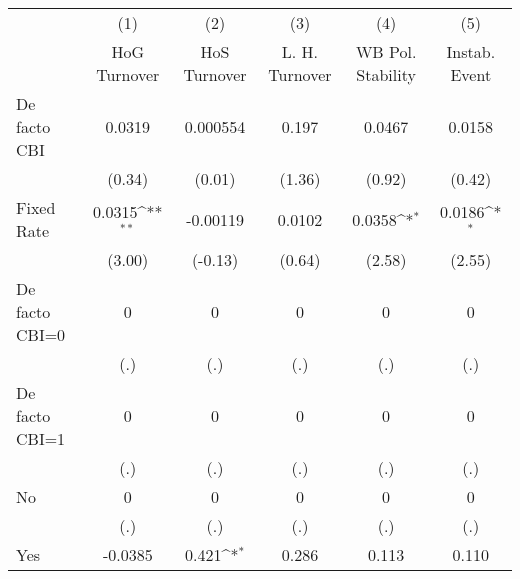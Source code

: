 \begin{table}[htbp]\centering
\def\sym#1{\ifmmode^{#1}\else\(^{#1}\)\fi}
\caption{\label{ifullicmultIndFEDF}}
\begin{tabular}{l*{5}{c}}
\toprule
                                        &\multicolumn{1}{c}{(1)}&\multicolumn{1}{c}{(2)}&\multicolumn{1}{c}{(3)}&\multicolumn{1}{c}{(4)}&\multicolumn{1}{c}{(5)}\\
                                        &\multicolumn{1}{c}{HoG Turnover}&\multicolumn{1}{c}{HoS Turnover}&\multicolumn{1}{c}{L. H. Turnover}&\multicolumn{1}{c}{WB Pol. Stability}&\multicolumn{1}{c}{Instab. Event}\\
\midrule
De facto CBI                            &   0.0319         & 0.000554         &    0.197         &   0.0467         &   0.0158         \\
                                        &   (0.34)         &   (0.01)         &   (1.36)         &   (0.92)         &   (0.42)         \\
\addlinespace
Fixed Rate                              &   0.0315\sym{**} & -0.00119         &   0.0102         &   0.0358\sym{*}  &   0.0186\sym{*}  \\
                                        &   (3.00)         &  (-0.13)         &   (0.64)         &   (2.58)         &   (2.55)         \\
\addlinespace
De facto CBI=0                          &        0         &        0         &        0         &        0         &        0         \\
                                        &      (.)         &      (.)         &      (.)         &      (.)         &      (.)         \\
\addlinespace
De facto CBI=1                          &        0         &        0         &        0         &        0         &        0         \\
                                        &      (.)         &      (.)         &      (.)         &      (.)         &      (.)         \\
\addlinespace
No                                      &        0         &        0         &        0         &        0         &        0         \\
                                        &      (.)         &      (.)         &      (.)         &      (.)         &      (.)         \\
\addlinespace
Yes                                     &  -0.0385         &    0.421\sym{*}  &    0.286         &    0.113         &    0.110         \\

\end{tabular}
\end{table}
